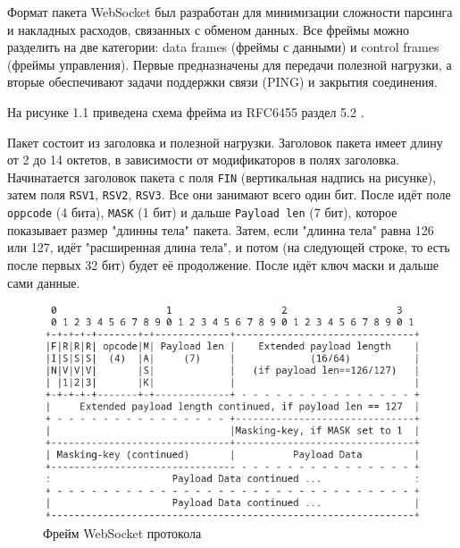 Формат пакета WebSocket был разработан для минимизации сложности парсинга и накладных расходов, связанных с обменом данных. Все фреймы можно разделить на две категории: data frames (фреймы с данными) и control frames (фреймы управления). Первые предназначены для передачи полезной нагрузки, а вторые обеспечивают задачи поддержки связи (PING) и закрытия соединения.

На рисунке 1.1 приведена схема фрейма из RFC6455 раздел 5.2 \cite{label2}.

Пакет состоит из заголовка и полезной нагрузки. Заголовок пакета имеет длину от 2 до 14 октетов, в зависимости от модификаторов в полях заголовка. Начинатается заголовок пакета с поля \texttt{FIN} (вертикальная надпись на рисунке), затем поля \texttt{RSV1}, \texttt{RSV2}, \texttt{RSV3}. Все они занимают всего один бит. После идёт поле \texttt{oppcode} (4 бита), \texttt{MASK} (1 бит) и дальше \texttt{Payload len} (7 бит), которое показывает размер "длинны тела" пакета. Затем, если "длинна тела" равна 126 или 127, идёт "расширенная длина тела", и потом (на следующей строке, то есть после первых 32 бит) будет её продолжение. После идёт ключ маски и дальше сами данные.

\begin{figure}[H]
\centering
\includegraphics[scale=0.8]{res/ws-frame}
\caption{Фрейм WebSocket протокола}
\end{figure}


